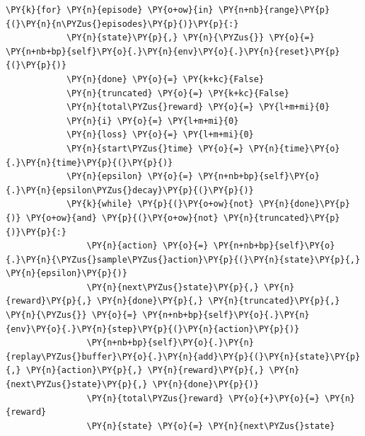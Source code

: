 \documentclass{article}
\begin{document}
\begin{Verbatim}[commandchars=\\\{\}]
        \PY{k}{for} \PY{n}{episode} \PY{o+ow}{in} \PY{n+nb}{range}\PY{p}{(}\PY{n}{n\PYZus{}episodes}\PY{p}{)}\PY{p}{:}
            \PY{n}{state}\PY{p}{,} \PY{n}{\PYZus{}} \PY{o}{=} \PY{n+nb+bp}{self}\PY{o}{.}\PY{n}{env}\PY{o}{.}\PY{n}{reset}\PY{p}{(}\PY{p}{)}
            \PY{n}{done} \PY{o}{=} \PY{k+kc}{False}
            \PY{n}{truncated} \PY{o}{=} \PY{k+kc}{False}
            \PY{n}{total\PYZus{}reward} \PY{o}{=} \PY{l+m+mi}{0}
            \PY{n}{i} \PY{o}{=} \PY{l+m+mi}{0}
            \PY{n}{loss} \PY{o}{=} \PY{l+m+mi}{0}
            \PY{n}{start\PYZus{}time} \PY{o}{=} \PY{n}{time}\PY{o}{.}\PY{n}{time}\PY{p}{(}\PY{p}{)}
            \PY{n}{epsilon} \PY{o}{=} \PY{n+nb+bp}{self}\PY{o}{.}\PY{n}{epsilon\PYZus{}decay}\PY{p}{(}\PY{p}{)}
            \PY{k}{while} \PY{p}{(}\PY{o+ow}{not} \PY{n}{done}\PY{p}{)} \PY{o+ow}{and} \PY{p}{(}\PY{o+ow}{not} \PY{n}{truncated}\PY{p}{)}\PY{p}{:}
                \PY{n}{action} \PY{o}{=} \PY{n+nb+bp}{self}\PY{o}{.}\PY{n}{\PYZus{}sample\PYZus{}action}\PY{p}{(}\PY{n}{state}\PY{p}{,} \PY{n}{epsilon}\PY{p}{)}
                \PY{n}{next\PYZus{}state}\PY{p}{,} \PY{n}{reward}\PY{p}{,} \PY{n}{done}\PY{p}{,} \PY{n}{truncated}\PY{p}{,} \PY{n}{\PYZus{}} \PY{o}{=} \PY{n+nb+bp}{self}\PY{o}{.}\PY{n}{env}\PY{o}{.}\PY{n}{step}\PY{p}{(}\PY{n}{action}\PY{p}{)}
                \PY{n+nb+bp}{self}\PY{o}{.}\PY{n}{replay\PYZus{}buffer}\PY{o}{.}\PY{n}{add}\PY{p}{(}\PY{n}{state}\PY{p}{,} \PY{n}{action}\PY{p}{,} \PY{n}{reward}\PY{p}{,} \PY{n}{next\PYZus{}state}\PY{p}{,} \PY{n}{done}\PY{p}{)}
                \PY{n}{total\PYZus{}reward} \PY{o}{+}\PY{o}{=} \PY{n}{reward}
                \PY{n}{state} \PY{o}{=} \PY{n}{next\PYZus{}state}


\end{Verbatim}
\end{document}
